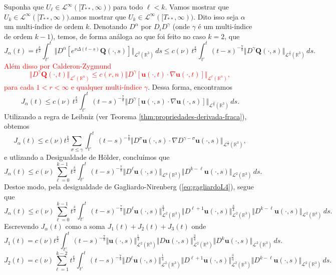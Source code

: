 \documentclass[a4paper, 11pt]{book}
\theoremstyle{definition}
\newcommand{\bR}{\mathbb{R}}
\newcommand{\bu}{\mathbf{u}}
\newcommand{\BQ}{\mathbf{Q}}
\newcommand{\cL}{\mathcal{L}}
\begin{document}
\begin{prf}
    Suponha que $U_{\ell} \in \cL^\infty([T_{**},\infty))$ para todo $\ell < k$. Vamos mostrar que $U_k \in \cL^\infty([T_{**},\infty))$.amos mostrar que $U_k \in \cL^\infty([T_{**},\infty))$. Dito isso seja $\alpha$ um multi-índice de ordem $k$.
    Denotando $D^\alpha$ por $D_i D^{\gamma}$ (onde $\gamma$ é um multi-índice de ordem $k-1$), temos, de forma análoga ao que foi feito no caso $k = 2$, que
    \[
        J_\alpha(t) = t^{\frac{k}{2}} \int_{t'}^t \Vert D^\alpha [ e^{\nu \Delta (t - s)}\BQ(\cdot,s)] \Vert_{\cL^2(\bR^3)} \,ds \leqslant c(\nu) \, t^{\frac{k}{2}} \int_{t'}^t (t - s)^{-\frac{7}{8}} \Vert D^{\gamma} \BQ(\cdot,s) \Vert_{\cL^\frac{4}{3}(\bR^3)} \,ds.
    \]
    \textcolor{red}{Além disso por Calderon-Zygmund
    \[
        \Vert D^{\gamma}\BQ(\cdot,t) \Vert_{\cL^r(\bR^n)} \leqslant c(r,n) \Vert D^{\gamma} [ \bu(\cdot,t) \cdot \nabla \bu(\cdot,t) ] \Vert_{\cL^r(\bR^n)},
    \]
    para cada $1 < r < \infty$ e qualquer multi-índice $\gamma$}. Dessa forma, encontramos
    \[
        J_\alpha(t) \leqslant c(\nu)\, t^{\frac{k}{2}} \int_{t'}^t (t-s)^{-\frac{7}{8}} \Vert D^{\gamma} [\bu(\cdot,s) \cdot \nabla \bu(\cdot,s)] \Vert_{\cL^\frac{4}{3}(\bR^3)}\,ds.
    \]
    Utilizando a regra de Leibniz (ver Teorema \ref{thm:propriedades-derivada-fraca}), obtemos
    \[
        J_\alpha(t) \leqslant c(\nu) t^{\frac{k}{2}} \sum_{\sigma \leqslant \gamma} \int_{t'}^t (t - s)^{-\frac{7}{8}} \Vert D^{\sigma} \bu(\cdot,s) \cdot \nabla D^{\gamma - \sigma} \bu(\cdot,s) \Vert_{\cL^{\frac{4}{3}}(\bR^3)},
    \]
    e utlizando a Desigualdade de Hölder, concluímos que
    \[
        J_\alpha(t) \leqslant c(\nu) \sum_{\ell = 0}^{k-1} t^{\frac{k}{2}} \int_{t'}^t (t- s)^{-\frac{7}{8}} \Vert D^\ell \bu(\cdot,s) \Vert_{\cL^4(\bR^3)} \Vert D^{k-\ell} \bu(\cdot,s) \Vert_{\cL^2(\bR^3)}\,ds.
    \]
    Destoe modo, pela desigualdade de Gagliardo-Nirenberg (\ref{eq:gagliardoL4}), segue que
    \[
        J_\alpha(t) \leqslant c(\nu) \sum_{\ell=0}^{k-1} t^{\frac{k}{2}} \int_{t'}^t ( t- s)^{-\frac{7}{8}} \Vert D^\ell \bu(\cdot,s) \Vert_{\cL^2(\bR^3)}^{\frac{1}{4}} \Vert D^{\ell + 1} \bu(\cdot,s) \Vert_{\cL^2(\bR^3)}^{\frac{3}{4}} \Vert D^{k-\ell} \bu(\cdot,s) \Vert_{\cL^2(\bR^3)} \,ds.
    \]
    Escrevendo $J_\alpha(t)$ como a soma $J_1(t) + J_2(t) + J_3(t)$ onde
    \[
        J_1(t) = c(\nu) t^{\frac{k}{2}} \int_{t'}^t ( t- s)^{-\frac{7}{8}} \Vert \bu(\cdot,s) \Vert_{\cL^2(\bR^3)}^{\frac{1}{4}} \Vert D \bu(\cdot,s) \Vert_{\cL^2(\bR^3)}^{\frac{3}{4}} \Vert D^{k} \bu(\cdot,s) \Vert_{\cL^2(\bR^3)} \,ds.
    \]
    \[
        J_2(t) = c(\nu) \sum_{\ell=1}^{k-2} t^{\frac{k}{2}} \int_{t'}^t ( t- s)^{-\frac{7}{8}} \Vert D^\ell \bu(\cdot,s) \Vert_{\cL^2(\bR^3)}^{\frac{1}{4}} \Vert D^{\ell + 1} \bu(\cdot,s) \Vert_{\cL^2(\bR^3)}^{\frac{3}{4}} \Vert D^{k-\ell} \bu(\cdot,s) \Vert_{\cL^2(\bR^3)} \,ds.
\]
\end{prf}
\end{document}
